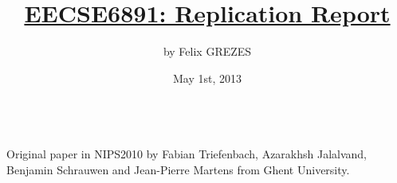\documentclass[12pt,a4paper,oneside]{article}
\begin{document}
\title{\noindent \underline {EECSE6891: Replication Report}}
\author{by Felix GREZES}
\date{May 1st, 2013 }
\maketitle

\bigskip \bigskip

\\

Original paper in NIPS2010 by Fabian Triefenbach, Azarakhsh Jalalvand, Benjamin Schrauwen and Jean-Pierre Martens from Ghent University.\\
\bigskip
\end{document}
